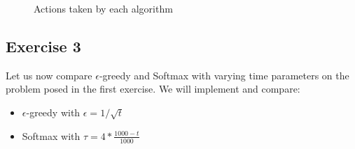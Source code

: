\documentclass[a4paper]{article}
\begin{document}
\begin{figure}[H]
	\centering
	\caption{Actions taken by each algorithm}
	\label{ex12a}
\end{figure}

\subsection{Exercise 3}
Let us now compare $\epsilon$-greedy and Softmax with varying time parameters
on the problem posed in the first exercise. We will implement and compare:
\begin{itemize}
	\item $\epsilon$-greedy with $\epsilon = 1/\sqrt{t}$
	\item Softmax with $\tau = 4*\frac{1000-t}{1000}$
\end{itemize}
\end{document}
